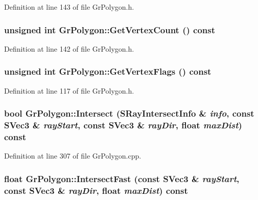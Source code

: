 \begin{CompactItemize}
Definition at line 143 of file GrPolygon.h.\hypertarget{class_gr_polygon_ef233c1659fde726aa60a1718a4ea8a4}{
\subsubsection[{GetVertexCount}]{\setlength{\rightskip}{0pt plus 5cm}unsigned int GrPolygon::GetVertexCount () const}}
\label{class_gr_polygon_ef233c1659fde726aa60a1718a4ea8a4}




Definition at line 142 of file GrPolygon.h.\hypertarget{class_gr_polygon_d5cb84031e18ea044c44cb7e245b7fc2}{
\subsubsection[{GetVertexFlags}]{\setlength{\rightskip}{0pt plus 5cm}unsigned int GrPolygon::GetVertexFlags () const}}
\label{class_gr_polygon_d5cb84031e18ea044c44cb7e245b7fc2}




Definition at line 117 of file GrPolygon.h.\hypertarget{class_gr_polygon_45191c8b4b5ee1943e690e27e4110562}{
\subsubsection[{Intersect}]{\setlength{\rightskip}{0pt plus 5cm}bool GrPolygon::Intersect ({\bf SRayIntersectInfo} \& {\em info}, \/  const {\bf SVec3} \& {\em rayStart}, \/  const {\bf SVec3} \& {\em rayDir}, \/  float {\em maxDist}) const}}
\label{class_gr_polygon_45191c8b4b5ee1943e690e27e4110562}




Definition at line 307 of file GrPolygon.cpp.\hypertarget{class_gr_polygon_94a66b2b31d98fb83f6f92a863946e8e}{
\subsubsection[{IntersectFast}]{\setlength{\rightskip}{0pt plus 5cm}float GrPolygon::IntersectFast (const {\bf SVec3} \& {\em rayStart}, \/  const {\bf SVec3} \& {\em rayDir}, \/  float {\em maxDist}) const}}
\label{class_gr_polygon_94a66b2b31d98fb83f6f92a863946e8e}





\end{CompactItemize}
